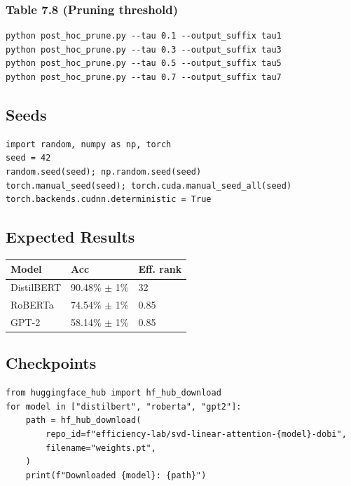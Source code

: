 \subsubsection{Table 7.8 (Pruning threshold)}
\begin{lstlisting}
python post_hoc_prune.py --tau 0.1 --output_suffix tau1
python post_hoc_prune.py --tau 0.3 --output_suffix tau3
python post_hoc_prune.py --tau 0.5 --output_suffix tau5
python post_hoc_prune.py --tau 0.7 --output_suffix tau7
\end{lstlisting}

\subsection{Seeds}

\begin{lstlisting}
import random, numpy as np, torch
seed = 42
random.seed(seed); np.random.seed(seed)
torch.manual_seed(seed); torch.cuda.manual_seed_all(seed)
torch.backends.cudnn.deterministic = True
\end{lstlisting}

\subsection{Expected Results}

\begin{table}[H]
\centering
\small
\begin{tabular}{lll}
\toprule
\textbf{Model} & \textbf{Acc} & \textbf{Eff. rank} \\
\midrule
DistilBERT & 90.48\% $\pm$ 1\% & 32 \\
RoBERTa & 74.54\% $\pm$ 1\% & 0.85 \\
GPT-2 & 58.14\% $\pm$ 1\% & 0.85 \\
\bottomrule
\end{tabular}
\end{table}

\subsection{Checkpoints}

\begin{lstlisting}
from huggingface_hub import hf_hub_download
for model in ["distilbert", "roberta", "gpt2"]:
    path = hf_hub_download(
        repo_id=f"efficiency-lab/svd-linear-attention-{model}-dobi",
        filename="weights.pt",
    )
    print(f"Downloaded {model}: {path}")
\end{lstlisting}


